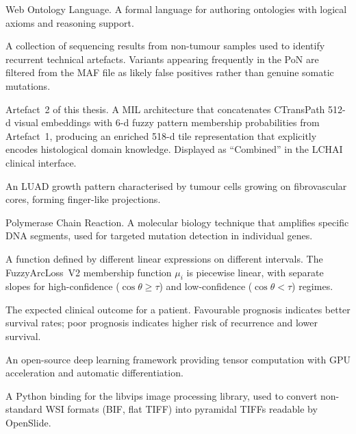 \begin{description}[style=nextline,leftmargin=4cm]
\item[OWL] Web Ontology Language.  A formal language for authoring ontologies with logical axioms and reasoning support.


\item[Panel of Normals (PoN)] A collection of sequencing results from non-tumour samples used to identify recurrent technical artefacts.  Variants appearing frequently in the PoN are filtered from the MAF file as likely false positives rather than genuine somatic mutations.


\item[PI-ABMIL (Pattern-Informed ABMIL)] Artefact~2 of this thesis.  A MIL architecture that concatenates CTransPath 512-d visual embeddings with 6-d fuzzy pattern membership probabilities from Artefact~1, producing an enriched 518-d tile representation that explicitly encodes histological domain knowledge.  Displayed as ``Combined'' in the LCHAI clinical interface.

\item[Papillary pattern] An LUAD growth pattern characterised by tumour cells growing on fibrovascular cores, forming finger-like projections.


\item[PCR] Polymerase Chain Reaction.  A molecular biology technique that amplifies specific DNA segments, used for targeted mutation detection in individual genes.


\item[Piecewise linear function] A function defined by different linear expressions on different intervals.  The FuzzyArcLoss~V2 membership function $\mu_i$ is piecewise linear, with separate slopes for high-confidence ($\cos\theta \geq \tau$) and low-confidence ($\cos\theta < \tau$) regimes.


\item[Prognosis] The expected clinical outcome for a patient.  Favourable prognosis indicates better survival rates; poor prognosis indicates higher risk of recurrence and lower survival.


\item[PyTorch] An open-source deep learning framework providing tensor computation with GPU acceleration and automatic differentiation.


\item[pyvips] A Python binding for the libvips image processing library, used to convert non-standard WSI formats (BIF, flat TIFF) into pyramidal TIFFs readable by OpenSlide.



\end{description}

